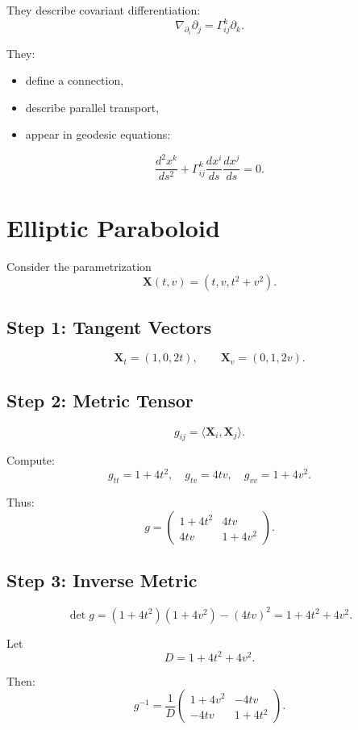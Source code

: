 \documentclass[a4paper,11pt]{article}
\begin{document}
	They describe covariant differentiation:
	\[
	\nabla_{\partial_i} \partial_j = \Gamma^k_{ij} \partial_k.
	\]
	
	They:
	\begin{itemize}
		\item define a connection,
		\item describe parallel transport,
		\item appear in geodesic equations:
	\end{itemize}
	
	\[
	\frac{d^2 x^k}{ds^2}
	+
	\Gamma^k_{ij}
	\frac{dx^i}{ds}
	\frac{dx^j}{ds}
	= 0.
	\]
	
	\section{Elliptic Paraboloid}
	
	Consider the parametrization
	\[
	\mathbf{X}(t,v) = (t, v, t^2 + v^2).
	\]
	
	\subsection{Step 1: Tangent Vectors}
	
	\[
	\mathbf{X}_t = (1, 0, 2t),
	\qquad
	\mathbf{X}_v = (0, 1, 2v).
	\]
	
	\subsection{Step 2: Metric Tensor}
	
	\[
	g_{ij} = \langle \mathbf{X}_i, \mathbf{X}_j \rangle.
	\]
	
	Compute:
	\[
	g_{tt} = 1 + 4t^2, \quad
	g_{tv} = 4tv, \quad
	g_{vv} = 1 + 4v^2.
	\]
	
	Thus:
	\[
	g =
	\begin{pmatrix}
		1 + 4t^2 & 4tv \\
		4tv & 1 + 4v^2
	\end{pmatrix}.
	\]
	
	\subsection{Step 3: Inverse Metric}
	
	\[
	\det g = (1+4t^2)(1+4v^2) - (4tv)^2 = 1 + 4t^2 + 4v^2.
	\]
	
	Let
	\[
	D = 1 + 4t^2 + 4v^2.
	\]
	
	Then:
	\[
	g^{-1} =
	\frac{1}{D}
	\begin{pmatrix}
		1 + 4v^2 & -4tv \\
		-4tv & 1 + 4t^2
	\end{pmatrix}.
	\]
	
\end{document}
